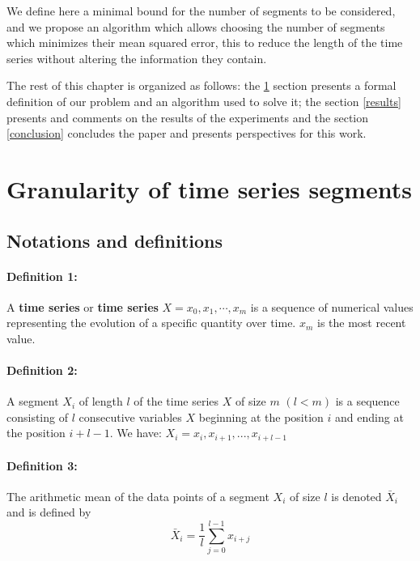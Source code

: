  
 
 We define here a minimal bound for the number of segments to be considered, and we propose an algorithm which allows choosing the number of segments which minimizes their mean squared error, this to reduce the length of the time series without altering the information they contain.
 
 
  The rest of this chapter is organized as follows: the \ref{probleme} section presents a formal definition of our problem and an algorithm used to solve it; the section \ref{results} presents and comments on the results of the experiments and the section \ref{conclusion} concludes the paper and presents perspectives for this work.
 

\section{Granularity of time series segments}
\label{probleme}


\subsection{Notations and definitions}
\paragraph{Definition 1:} A \textbf{time series} or \textbf{time series}
$ X = x_{0}, x_{1}, \cdots, x_{m} $ is a sequence of numerical values representing the evolution of a specific quantity over time. $ x_{m} $ is the most recent value.

\paragraph{Definition 2:} A segment $ X_{i} $ of length $ l $ of the time series
$ X $ of size $ m $ $ (l <m) $ is a sequence consisting of $ l $ consecutive variables
$ X $ beginning at the  position  $ i $  and ending at the position $ i + l-1 $.
We have: $ X_{i} = x_{i}, x_{i + 1}, ..., x_{i + l-1} $

\paragraph{Definition 3:} The arithmetic mean of the data points of a segment $ X_{i} $ of size $ l $ is
denoted $ \bar {X}_{i} $ and is defined by
\[
\bar{X}_{i} = \frac{1}{l} \sum_{j = 0}^{l-1} x_{i + j}
\]



